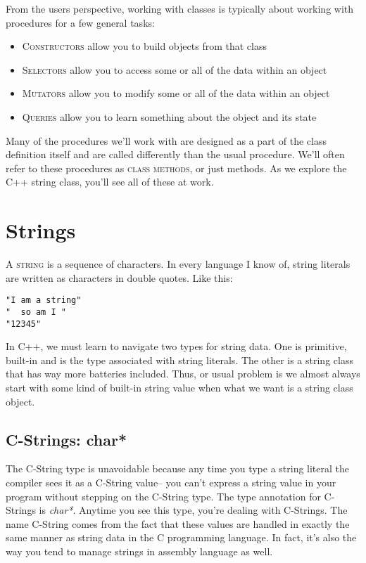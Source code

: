 \documentclass[]{tufte-handout}
\begin{document}
From the users perspective, working with classes is typically about working with procedures for a few general tasks:
\begin{itemize}
\item \textsc{Constructors} allow you to build objects from that class
\item \textsc{Selectors} allow you to access some or all of the data within an object
\item \textsc{Mutators} allow you to modify some or all of the data within an object 
\item \textsc{Queries} allow you to learn something about the object and its state
\end{itemize} 
Many of the procedures we'll work with are designed as a part of the class definition itself and are called differently than the usual procedure. We'll often refer to these procedures as \textsc{class methods}, or just methods. As we explore the C++ string class, you'll see all of these at work. 

\section{Strings}

A \textsc{string} is a sequence of characters. In every language I know of, string literals are written as characters in double quotes. Like this:
\begin{verbatim}
"I am a string"
"  so am I "
"12345"
\end{verbatim}

In C++, we must learn to navigate two types for string data. One is primitive, built-in and is the type associated with string literals. The other is a string class that has way more batteries included. Thus, or usual problem is we almost always start with some kind of built-in string value when what we want is a string class object. 

\subsection{C-Strings: char*}

The C-String type is unavoidable because any time you type a string literal the compiler sees it as a C-String value-- you can't express a string value in your program without stepping on the C-String type. The type annotation for C-Strings is \textit{char*}.  Anytime you see this type, you're dealing with C-Strings. The name C-String comes from the fact that these values are handled in exactly the same manner as string data in the C programming language. In fact, it's also the way you tend to manage strings in assembly language as well.  
\end{document}
